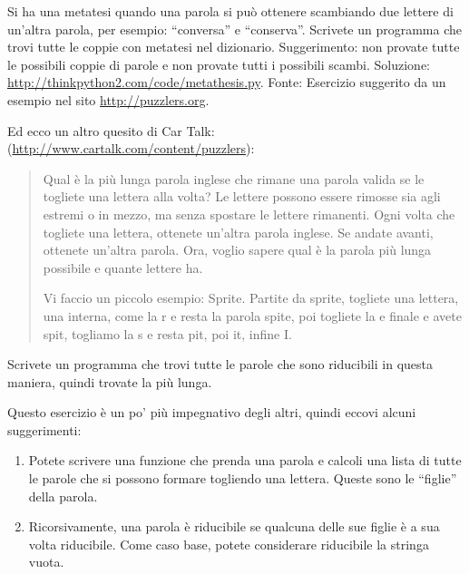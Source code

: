\documentclass[10pt]{book}
\begin{document}
\vspace{0.2in}
\begin{exercise}

Si ha una metatesi quando una parola si può ottenere scambiando due lettere di un'altra parola, per esempio: ``conversa'' e ``conserva''.  Scrivete un programma che trovi tutte le coppie con metatesi nel dizionario. Suggerimento: non provate tutte le possibili coppie di parole e non provate tutti i possibili scambi. Soluzione: \url{http://thinkpython2.com/code/metathesis.py}.
Fonte: Esercizio suggerito da un esempio nel sito \url{http://puzzlers.org}.

\end{exercise}


\vspace{0.2in}
\begin{exercise}

Ed ecco un altro quesito di Car Talk:
(\url{http://www.cartalk.com/content/puzzlers}):

\begin{quote}
Qual è la più lunga parola inglese che rimane una parola valida se le togliete una lettera alla volta? 
Le lettere possono essere rimosse sia agli estremi o in mezzo, ma senza spostare le lettere rimanenti. Ogni volta che togliete una lettera, ottenete un'altra parola inglese. Se andate avanti, ottenete un'altra parola. Ora, voglio sapere qual è la parola più lunga possibile e quante lettere ha.

Vi faccio un piccolo esempio: Sprite. Partite da sprite, togliete una lettera, una interna, come la r e resta la parola spite, poi togliete la e finale e avete spit, togliamo la s e resta pit, poi it, infine I.
\end{quote}

Scrivete un programma che trovi tutte le parole che sono riducibili in questa maniera, quindi trovate la più lunga.

Questo esercizio è un po' più impegnativo degli altri, quindi eccovi alcuni suggerimenti:

\begin{enumerate}

\item Potete scrivere una funzione che prenda una parola e calcoli una lista di tutte le parole che si possono formare togliendo una lettera. Queste sono le ``figlie'' della parola.

\item Ricorsivamente, una parola è riducibile se qualcuna delle sue figlie è a sua volta riducibile. Come caso base, potete considerare riducibile la stringa vuota.


\end{enumerate}
\end{exercise}
\end{document}
